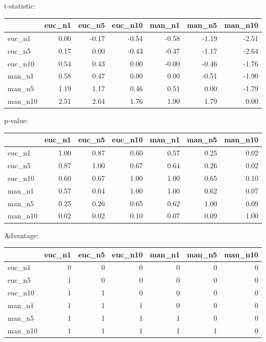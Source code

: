 t-statistic:
 \begin{tabular}{lrrrrrr}
\hline
         &   euc\_n1 &   euc\_n5 &   euc\_n10 &   man\_n1 &   man\_n5 &   man\_n10 \\
\hline
 euc\_n1  &     0.00 &    -0.17 &     -0.54 &    -0.58 &    -1.19 &     -2.51 \\
 euc\_n5  &     0.17 &     0.00 &     -0.43 &    -0.47 &    -1.17 &     -2.64 \\
 euc\_n10 &     0.54 &     0.43 &      0.00 &    -0.00 &    -0.46 &     -1.76 \\
 man\_n1  &     0.58 &     0.47 &      0.00 &     0.00 &    -0.51 &     -1.90 \\
 man\_n5  &     1.19 &     1.17 &      0.46 &     0.51 &     0.00 &     -1.79 \\
 man\_n10 &     2.51 &     2.64 &      1.76 &     1.90 &     1.79 &      0.00 \\
\hline
\end{tabular} 

p-value:
 \begin{tabular}{lrrrrrr}
\hline
         &   euc\_n1 &   euc\_n5 &   euc\_n10 &   man\_n1 &   man\_n5 &   man\_n10 \\
\hline
 euc\_n1  &     1.00 &     0.87 &      0.60 &     0.57 &     0.25 &      0.02 \\
 euc\_n5  &     0.87 &     1.00 &      0.67 &     0.64 &     0.26 &      0.02 \\
 euc\_n10 &     0.60 &     0.67 &      1.00 &     1.00 &     0.65 &      0.10 \\
 man\_n1  &     0.57 &     0.64 &      1.00 &     1.00 &     0.62 &      0.07 \\
 man\_n5  &     0.25 &     0.26 &      0.65 &     0.62 &     1.00 &      0.09 \\
 man\_n10 &     0.02 &     0.02 &      0.10 &     0.07 &     0.09 &      1.00 \\
\hline
\end{tabular} 

Advantage:
 \begin{tabular}{lrrrrrr}
\hline
         &   euc\_n1 &   euc\_n5 &   euc\_n10 &   man\_n1 &   man\_n5 &   man\_n10 \\
\hline
 euc\_n1  &        0 &        0 &         0 &        0 &        0 &         0 \\
 euc\_n5  &        1 &        0 &         0 &        0 &        0 &         0 \\
 euc\_n10 &        1 &        1 &         0 &        0 &        0 &         0 \\
 man\_n1  &        1 &        1 &         1 &        0 &        0 &         0 \\
 man\_n5  &        1 &        1 &         1 &        1 &        0 &         0 \\
 man\_n10 &        1 &        1 &         1 &        1 &        1 &         0 \\
\hline
\end{tabular} 

